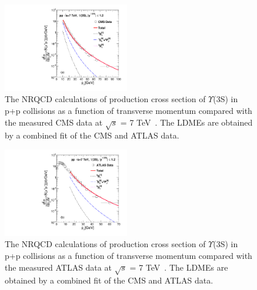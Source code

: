 \documentclass[twocolumn,amsmath,amssymb]{snp}
\begin{document}
\begin{figure}
  \includegraphics[width=0.49\textwidth]{Fig1_Y3S_CMS.pdf}
  \caption{The NRQCD calculations of production cross section of $\Upsilon$(3S) in p+p collisions 
    as a function of transverse momentum compared with the measured CMS data at $\sqrt{s}$ = 7 
    TeV~\cite{Khachatryan:2015qpa}. The LDMEs are obtained by a combined fit of the 
    CMS and ATLAS data.}
  \label{Fig:SigmaY3SCMS}
\end{figure}
\begin{figure}
  \includegraphics[width=0.49\textwidth]{Fig2_Y3S_ATLAS.pdf}
  \caption{The NRQCD calculations of production cross section of $\Upsilon$(3S) in p+p collisions 
    as a function of transverse momentum compared with the measured ATLAS data at $\sqrt{s}$ = 7 
    TeV~\cite{Aad:2012dlq}. The LDMEs are obtained by a combined fit of the 
    CMS and ATLAS data.}
  \label{Fig:SigmaY3SATLAS}
\end{figure}
\end{document}
